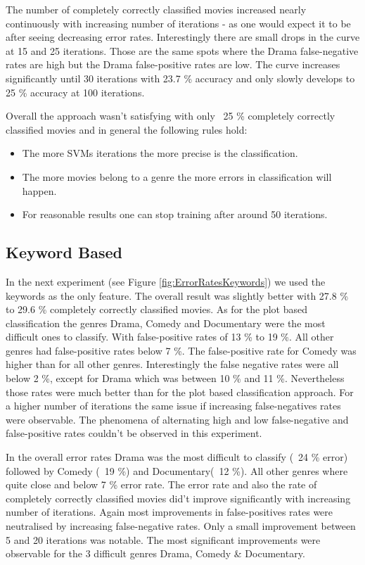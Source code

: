 \documentclass{vldb}
\begin{document}
\par The number of completely correctly classified movies increased nearly continuously with increasing number of iterations - as one would expect it to be after seeing decreasing error rates. Interestingly there are small drops in the curve at 15 and 25 iterations. Those are the same spots where the Drama false-negative rates are high but the Drama false-positive rates are low. The curve increases significantly until 30 iterations with 23.7 \% accuracy and only slowly develops to 25 \% accuracy at 100 iterations.
\par Overall the approach wasn’t satisfying with only ~25 \% completely correctly classified movies and in general the following rules hold:
\begin{itemize}
\item {The more SVMs iterations the more precise is the classification.}
\item {The more movies belong to a genre the more errors in classification will happen.}
\item {For reasonable results one can stop training after around 50 iterations.}
\end{itemize}


\subsection{Keyword Based}
\par In the next experiment (see Figure \ref{fig:ErrorRatesKeywords})  we used the keywords as the only feature. The overall result was slightly better with 27.8 \% to 29.6 \% completely correctly classified movies.
As for the plot based classification the genres Drama, Comedy and Documentary were the most difficult  ones to classify. With false-positive rates of 13 \% to 19 \%. All other genres had false-positive rates below 7 \%. 
The false-positive rate for Comedy was higher than for all other genres. Interestingly the false negative rates were all below 2 \%, except for Drama which was between 10 \% and 11 \%. Nevertheless those rates were much better than for the plot based classification approach. For a higher number of iterations the same issue if increasing false-negatives rates were observable. The phenomena of alternating high and low false-negative and false-positive rates couldn’t be observed in this experiment.
\par In the overall error rates Drama was the most difficult to classify (~24 \% error) followed by Comedy (~19 \%) and Documentary(~12 \%). All other genres where quite close and below 7 \% error rate. The error rate and also the rate of completely correctly classified movies did’t improve significantly with increasing number of iterations. Again most improvements in false-positives rates were neutralised by increasing false-negative rates. Only a small improvement between 5 and 20 iterations was notable. The most significant improvements were observable for the 3 difficult genres Drama, Comedy \& Documentary.
\end{document}
